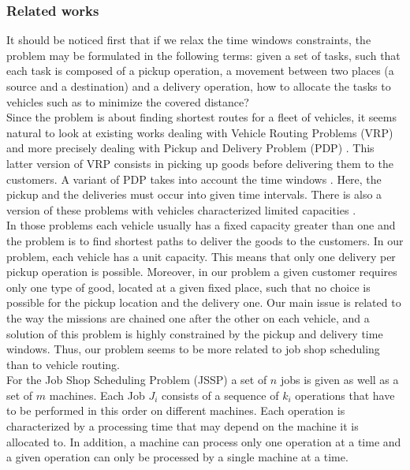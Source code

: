 \documentclass[review]{elsarticle}
\begin{document}
\subsubsection{Related works}

It should be noticed first that if we relax the time windows constraints, the problem may be formulated in the following terms: given a set of tasks, such that each task is composed of a pickup operation, a movement between two places (a source and a destination) and a delivery operation, how to allocate the tasks to vehicles such as to minimize the covered distance? \\%


Since the problem is about finding shortest routes for a fleet of vehicles, it seems natural to look at existing works dealing with Vehicle Routing Problems (VRP) \cite{Toth2001,Laporte1992} and more precisely dealing with Pickup and Delivery Problem (PDP) \cite{Berbeglia2007}. This latter version of VRP consists in picking up goods before delivering them to the customers. A variant of PDP takes into account the time windows \cite{Mitrovic1998}. Here, the pickup and the deliveries must occur into given time intervals. There is also a version of these problems with vehicles characterized limited capacities \cite{Toth2001}. \\

In those problems each vehicle usually has a fixed capacity greater than one and the problem is to find shortest paths to deliver the goods to the customers. In our problem, each vehicle has a unit capacity. This means that only one delivery per pickup operation is possible. Moreover, in our problem a given customer requires only one type of good, located at a given fixed place, such that no choice is possible for the pickup location and the delivery one. Our main issue is related to the way the missions are chained one after the other on each vehicle, and a solution of this problem is highly constrained by the pickup and delivery time windows. Thus, our problem seems to be more related to job shop scheduling than to vehicle routing.\\

For the Job Shop Scheduling Problem (JSSP) a set of $n$ jobs is given as well as a set of $m$ machines. Each Job $J_i$ consists of a sequence of $k_i$ operations that have to be performed in this order on different machines. Each operation is characterized by a processing time that may depend on the machine it is allocated to. In addition, a machine can process only one operation at a time and a given operation can only be processed by a single machine at a time. \\
\end{document}
